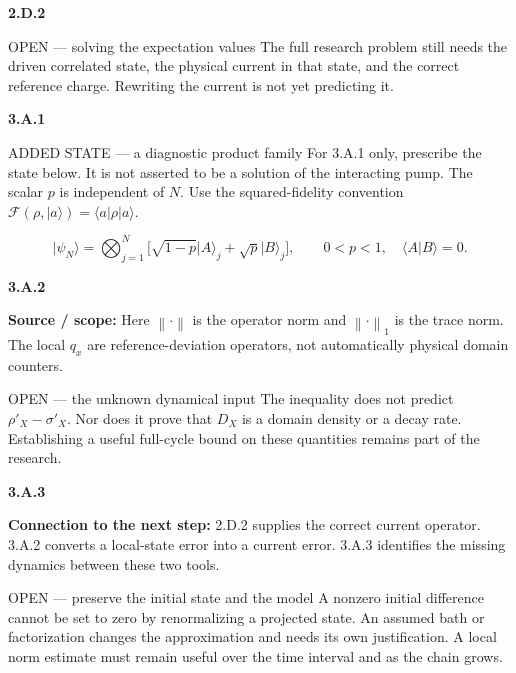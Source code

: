 \documentclass[11pt,a4paper]{article}
\newcommand{\ket}[1]{\lvert #1\rangle}
\newcommand{\bra}[1]{\langle #1\rvert}
\newcommand{\braket}[2]{\langle #1\vert #2\rangle}
\newcommand{\norm}[1]{\left\lVert #1\right\rVert}
\begin{document}
\par\medskip\textbf{2.D.2}\par
\begin{redbox}{OPEN --- solving the expectation values}
The full research problem still needs the driven correlated state, the physical current in that state, and the correct reference charge. Rewriting the current is not yet predicting it.
\end{redbox}
\par\medskip\textbf{3.A.1}\par
\begin{redbox}{ADDED STATE --- a diagnostic product family}
For 3.A.1 only, prescribe the state below. It is not asserted to be a solution of the interacting pump. The scalar $p$ is independent of $N$. Use the squared-fidelity convention $\mathcal F(\rho,\ket a)=\bra a\rho\ket a$.

\[
\ket{\psi_N}=\bigotimes_{j=1}^N
\big[\sqrt{1-p}\ket A_j+\sqrt p\ket B_j\big],
\qquad0<p<1,\quad\braket A B=0.
\]
\end{redbox}
\par\medskip\textbf{3.A.2}\par
{\footnotesize\textbf{Source / scope:} Here $\norm{\cdot}$ is the operator norm and $\norm{\cdot}_1$ is the trace norm. The local $q_x$ are reference-deviation operators, not automatically physical domain counters.}\par
\begin{redbox}{OPEN --- the unknown dynamical input}
The inequality does not predict $\rho'_X-\sigma'_X$. Nor does it prove that $D_X$ is a domain density or a decay rate. Establishing a useful full-cycle bound on these quantities remains part of the research.
\end{redbox}
\par\medskip\textbf{3.A.3}\par
{\small\textbf{Connection to the next step:} 2.D.2 supplies the correct current operator. 3.A.2 converts a local-state error into a current error. 3.A.3 identifies the missing dynamics between these two tools.}\par
\begin{redbox}{OPEN --- preserve the initial state and the model}
A nonzero initial difference cannot be set to zero by renormalizing a projected state. An assumed bath or factorization changes the approximation and needs its own justification. A local norm estimate must remain useful over the time interval and as the chain grows.
\end{redbox}
\end{document}
